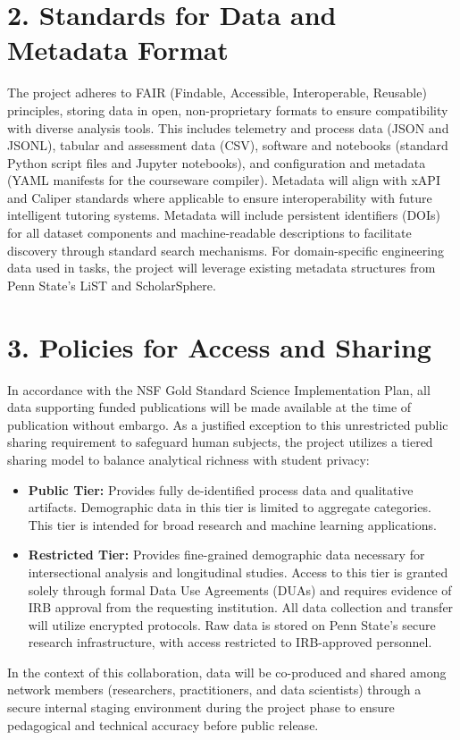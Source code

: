 \documentclass[11pt]{article}
\begin{document}
\section*{2. Standards for Data and Metadata Format}
The project adheres to FAIR (Findable, Accessible, Interoperable, Reusable) principles, storing data in open, non-proprietary formats to ensure compatibility with diverse analysis tools. This includes telemetry and process data (JSON and JSONL), tabular and assessment data (CSV), software and notebooks (standard Python script files and Jupyter notebooks), and configuration and metadata (YAML manifests for the courseware compiler).
Metadata will align with xAPI and Caliper standards where applicable to ensure interoperability with future intelligent tutoring systems.
Metadata will include persistent identifiers (DOIs) for all dataset components and machine-readable descriptions to facilitate discovery through standard search mechanisms.
For domain-specific engineering data used in tasks, the project will leverage existing metadata structures from Penn State's LiST and ScholarSphere.

\section*{3. Policies for Access and Sharing}

In accordance with the NSF Gold Standard Science Implementation Plan, all data supporting funded publications will be made available at the time of publication without embargo.
As a justified exception to this unrestricted public sharing requirement to safeguard human subjects, the project utilizes a tiered sharing model to balance analytical richness with student privacy:
\vspace{-0.3cm}
\begin{itemize}
    \item \textbf{Public Tier:} Provides fully de-identified process data and qualitative artifacts. Demographic data in this tier is limited to aggregate categories. This tier is intended for broad research and machine learning applications.\vspace{-0.3cm}
    \item \textbf{Restricted Tier:} Provides fine-grained demographic data necessary for intersectional analysis and longitudinal studies. Access to this tier is granted solely through formal Data Use Agreements (DUAs) and requires evidence of IRB approval from the requesting institution. All data collection and transfer will utilize encrypted protocols. Raw data is stored on Penn State’s secure research infrastructure, with access restricted to IRB-approved personnel.\vspace{-0.3cm}
\end{itemize}
In the context of this collaboration, data will be co-produced and shared among network members (researchers, practitioners, and data scientists) through a secure internal staging environment during the project phase to ensure pedagogical and technical accuracy before public release.
\end{document}
